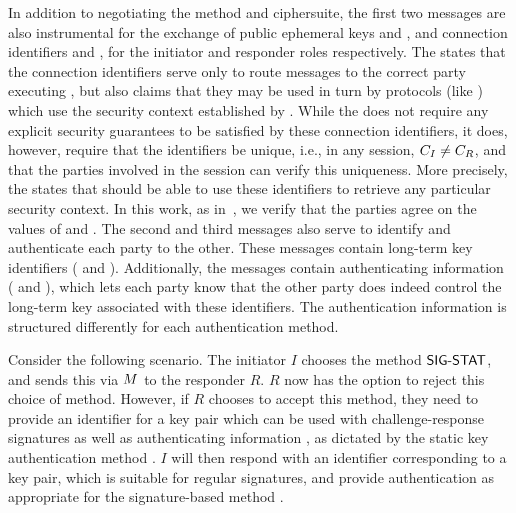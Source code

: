 In addition to negotiating the method and ciphersuite, the first two messages are
also instrumental for the exchange of public ephemeral keys \mGx{} and
\mGy{},
and connection identifiers \mCi{} and \mCr{}, for the initiator and responder
roles respectively.
%
The \mSpec{} states that the connection identifiers serve only to route
messages
to the correct party executing \mEdhoc{}, but also claims that they may be
used in turn by protocols (like \mOscore{}) which use the security context
established by \mEdhoc{}.
%
While the \mSpec{} does not require any explicit security guarantees to be
satisfied by these connection identifiers, it does, however, require that the
identifiers be unique, i.e., in any session, $C_I{} \neq C_R{}$, and that the
parties involved in the session can verify this uniqueness.
%
More precisely, the \mSpec{} states that \mOscore{} should be able to use these
identifiers to retrieve any particular security context.
%
In this work, as in~\cite{Norr21}, we verify that the parties agree on the
values of \mCi{} and \mCr{}.
%
The second and third messages also serve to identify and authenticate each
party to the other.
%
These messages contain long-term key identifiers (\mIdcredi{} and
\mIdcredr{}).
%
Additionally, the messages contain authenticating information
(\mAuthi{} and \mAuthr{}), which lets each
party know that the other party does indeed control the long-term key
associated with these identifiers.
%
The authentication information is structured differently for each authentication method.
%

Consider the following scenario.
%
The initiator $I$ chooses the method $\textsf{SIG-STAT}{}$, and sends this via
$M{}$ to the responder $R$.
%
$R$ now has the option to reject this choice of method.
%
However, if $R$ chooses to accept this method, they need to provide an
identifier \mIdcredr{} for a key pair which can be used with
challenge-response
signatures
as well as authenticating information \mAuthr{}, as dictated by
the static key authentication method \mStat{}.
%
$I$ will then respond with an identifier \mIdcredi{} corresponding to a key
pair, which is suitable for regular signatures, and provide authentication
\mAuthi{} as appropriate for the signature-based method \mSig{}.


